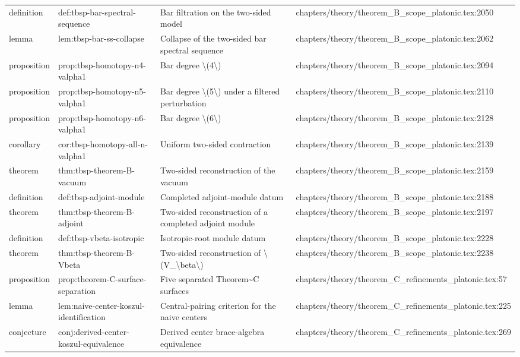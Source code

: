 \documentclass[11pt]{article}
\begin{document}
\begin{longtable}{L{0.10\textwidth}L{0.26\textwidth}L{0.42\textwidth}L{0.22\textwidth}}
definition & def:tbsp-bar-spectral-sequence & Bar filtration on the two-sided model & chapters/theory/theorem\_B\_scope\_platonic.tex:2050\\
lemma & lem:tbsp-bar-ss-collapse & Collapse of the two-sided bar spectral sequence & chapters/theory/theorem\_B\_scope\_platonic.tex:2062\\
proposition & prop:tbsp-homotopy-n4-valpha1 & Bar degree \textbackslash{}(4\textbackslash{}) & chapters/theory/theorem\_B\_scope\_platonic.tex:2094\\
proposition & prop:tbsp-homotopy-n5-valpha1 & Bar degree \textbackslash{}(5\textbackslash{}) under a filtered perturbation & chapters/theory/theorem\_B\_scope\_platonic.tex:2110\\
proposition & prop:tbsp-homotopy-n6-valpha1 & Bar degree \textbackslash{}(6\textbackslash{}) & chapters/theory/theorem\_B\_scope\_platonic.tex:2128\\
corollary & cor:tbsp-homotopy-all-n-valpha1 & Uniform two-sided contraction & chapters/theory/theorem\_B\_scope\_platonic.tex:2139\\
theorem & thm:tbsp-theorem-B-vacuum & Two-sided reconstruction of the vacuum & chapters/theory/theorem\_B\_scope\_platonic.tex:2159\\
definition & def:tbsp-adjoint-module & Completed adjoint-module datum & chapters/theory/theorem\_B\_scope\_platonic.tex:2188\\
theorem & thm:tbsp-theorem-B-adjoint & Two-sided reconstruction of a completed adjoint module & chapters/theory/theorem\_B\_scope\_platonic.tex:2197\\
definition & def:tbsp-vbeta-isotropic & Isotropic-root module datum & chapters/theory/theorem\_B\_scope\_platonic.tex:2228\\
theorem & thm:tbsp-theorem-B-Vbeta & Two-sided reconstruction of \textbackslash{}(V\_\textbackslash{}beta\textbackslash{}) & chapters/theory/theorem\_B\_scope\_platonic.tex:2238\\
proposition & prop:theorem-C-surface-separation & Five separated Theorem\textasciitilde{}C surfaces & chapters/theory/theorem\_C\_refinements\_platonic.tex:57\\
lemma & lem:naive-center-koszul-identification & Central-pairing criterion for the naive centers & chapters/theory/theorem\_C\_refinements\_platonic.tex:225\\
conjecture & conj:derived-center-koszul-equivalence & Derived center brace-algebra equivalence & chapters/theory/theorem\_C\_refinements\_platonic.tex:269\\

\end{longtable}
\end{document}
